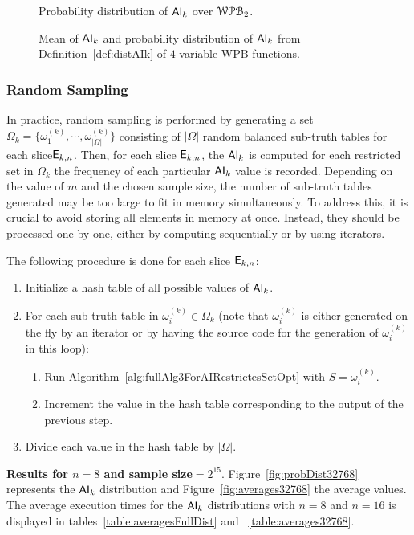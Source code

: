\documentclass[11pt]{llncs}
\begin{document}
\begin{figure}[ht]
\begin{minipage}[b]{0.5\textwidth}
        \caption{Probability distribution of $\mathsf{AI}_{k}$  over $\mathcal{WPB}_{2}$.}
        \label{fig:probFullDist}
    \end{minipage}
    \caption{Mean of $\mathsf{AI}_{k}$ and probability distribution of $\mathsf{AI}_{k}$ from Definition~\ref{def:distAIk} of $4$-variable WPB functions.}
    \label{fig:dullDist}
\end{figure}

\subsubsection{Random Sampling}
In practice, random sampling is performed by generating a set $\Omega_k = \{\omega_1^{(k)}, \cdots, \omega_{|\Omega|}^{(k)}\}$ consisting of $|\Omega|$ random balanced sub-truth tables for each slice$ \mathsf{E}_{k,n}$. 
Then, for each slice $\mathsf{E}_{k,n}$, the $\mathsf{AI}_{k}$ is computed for each restricted set in $\Omega_k$ the frequency of each particular $\mathsf{AI}_{k}$ value is recorded.
Depending on the value of $m$ and the chosen sample size, the number of sub-truth tables generated may be too large to fit in memory simultaneously. 
To address this, it is crucial to avoid storing all elements in memory at once. 
Instead, they should be processed one by one, either by computing sequentially or by using iterators.





The following procedure is done for each slice $\mathsf{E}_{k,n}$:
\begin{enumerate}
    \item Initialize a hash table of all possible values of $\mathsf{AI}_{k}$.
    \item For each sub-truth table in $\omega_i^{(k)} \in \Omega_k$ (note that $\omega_i^{(k)}$ is either generated on the fly by an iterator or by having the source code for the generation of $\omega_i^{(k)}$ in this loop):
    \begin{enumerate}
        \item Run Algorithm~\ref{alg:fullAlg3ForAIRestrictesSetOpt} with $S=\omega_i^{(k)}$\label{enum:stepOfapplicationEnum}.
        \item Increment the value in the hash table corresponding to the output of the previous step.
    \end{enumerate}
    \item Divide each value in the hash table by $|\Omega|$.
\end{enumerate}

\noindent
\textbf{Results for $n=8$ and sample size$=2^{15}$}.
Figure~\ref{fig:probDist32768} represents the $\mathsf{AI}_{k}$ distribution and Figure~\ref{fig:averages32768} the average values. 
The average execution times for the $\mathsf{AI}_{k}$ distributions with $n=8$ and $n=16$ is displayed in tables~\ref{table:averagesFullDist} and ~\ref{table:averages32768}.
\end{document}
